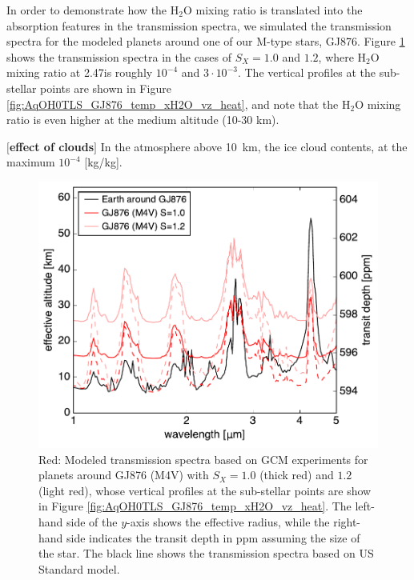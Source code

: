 \documentclass[11pt,numberedappendix,twocolappendix,]{emulateapj}
\def\water{H$_2$O }
\def\preslevel{2.47}
\def\memo#1{\color{red}$[${\bf #1}$]$ \color{black}}
\begin{document}
In order to demonstrate how the \water mixing ratio is translated into the absorption features in the transmission spectra, 
we simulated the transmission spectra for the modeled planets around one of our M-type stars, GJ876. 
Figure \ref{fig:transmission} shows the transmission spectra in the cases of $S_X=1.0$ and $1.2$, where \water mixing ratio at \preslevel is roughly $10^{-4}$ and $3\cdot 10^{-3}$. 
The vertical profiles at the sub-stellar points are shown in Figure \ref{fig:AqOH0TLS_GJ876_temp_xH2O_vz_heat}, and note that the \water mixing ratio is even higher at the medium altitude (10-30 km). 

\memo{effect of clouds}
In the atmosphere above 10~km, the ice cloud contents, at the maximum $10^{-4}$ [kg/kg]. 






\begin{figure}[!h]
    \begin{center}
    \includegraphics[width=\hsize]{fig/transit_GJ876.pdf}
    \end{center}
\caption{Red: Modeled transmission spectra based on GCM experiments for planets around GJ876 (M4V) with $S_X=1.0$ (thick red) and $1.2$ (light red), whose vertical profiles at the sub-stellar points are show in Figure \ref{fig:AqOH0TLS_GJ876_temp_xH2O_vz_heat}. The left-hand side of the $y$-axis shows the effective radius, while the right-hand side indicates the transit depth in ppm assuming the size of the star. The black line shows the transmission spectra based on US Standard model. }
\label{fig:transmission}
\end{figure}
\end{document}
